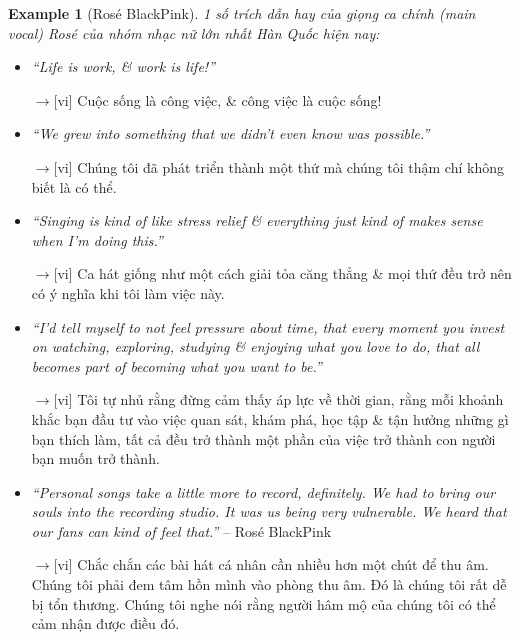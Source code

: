 \documentclass[12pt,twoside]{book}
\newtheorem{example}{Example}
\begin{document}
\begin{example}[{\sc Ros\'e BlackPink}]
	1 số trích dẫn hay của giọng ca chính (main vocal) Ros\'e của nhóm nhạc nữ lớn nhất Hàn Quốc hiện nay:
\end{example}
\begin{itemize}
	\item {\it``Life is work, \& work is life!''}
	
	{\sf[en]$\to$[vi]} Cuộc sống là công việc, \& công việc là cuộc sống!
	
	\item {\it``We grew into something that we didn't even know was possible.''}
	
	{\sf[en]$\to$[vi]} Chúng tôi đã phát triển thành một thứ mà chúng tôi thậm chí không biết là có thể.
	
	\item {\it``Singing is kind of like stress relief \& everything just kind of makes sense when I'm doing this.''}
	
	{\sf[en]$\to$[vi]} Ca hát giống như một cách giải tỏa căng thẳng \& mọi thứ đều trở nên có ý nghĩa khi tôi làm việc này.
	
	\item {\it``I'd tell myself to not feel pressure about time, that every moment you invest on watching, exploring, studying \& enjoying what you love to do, that all becomes part of becoming what you want to be.''}
	
	{\sf[en]$\to$[vi]} Tôi tự nhủ rằng đừng cảm thấy áp lực về thời gian, rằng mỗi khoảnh khắc bạn đầu tư vào việc quan sát, khám phá, học tập \& tận hưởng những gì bạn thích làm, tất cả đều trở thành một phần của việc trở thành con người bạn muốn trở thành.
	
	\item {\it``Personal songs take a little more to record, definitely. We had to bring our souls into the recording studio. It was us being very vulnerable. We heard that our fans can kind of feel that.''} -- {\sc Ros\'e BlackPink}
	
	{\sf[en]$\to$[vi]} Chắc chắn các bài hát cá nhân cần nhiều hơn một chút để thu âm. Chúng tôi phải đem tâm hồn mình vào phòng thu âm. Đó là chúng tôi rất dễ bị tổn thương. Chúng tôi nghe nói rằng người hâm mộ của chúng tôi có thể cảm nhận được điều đó.
\end{itemize}
\end{document}
